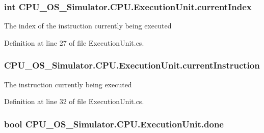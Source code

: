 \subsubsection[{current\+Index}]{\setlength{\rightskip}{0pt plus 5cm}int C\+P\+U\+\_\+\+O\+S\+\_\+\+Simulator.\+C\+P\+U.\+Execution\+Unit.\+current\+Index\hspace{0.3cm}{\ttfamily [private]}}\label{class_c_p_u___o_s___simulator_1_1_c_p_u_1_1_execution_unit_af6807cb5343acc2c40a08166c748f1f0}


The index of the instruction currently being executed 



Definition at line 27 of file Execution\+Unit.\+cs.

\hypertarget{class_c_p_u___o_s___simulator_1_1_c_p_u_1_1_execution_unit_a12fc8d1fd19eab177941b9f98675eb7f}{}
\subsubsection[{current\+Instruction}]{ C\+P\+U\+\_\+\+O\+S\+\_\+\+Simulator.\+C\+P\+U.\+Execution\+Unit.\+current\+Instruction\hspace{0.3cm}{\ttfamily [private]}}\label{class_c_p_u___o_s___simulator_1_1_c_p_u_1_1_execution_unit_a12fc8d1fd19eab177941b9f98675eb7f}


The instruction currently being executed 



Definition at line 32 of file Execution\+Unit.\+cs.

\hypertarget{class_c_p_u___o_s___simulator_1_1_c_p_u_1_1_execution_unit_aa62cb66691fd4d782a4fa5c70843da6e}{}
\subsubsection[{done}]{\setlength{\rightskip}{0pt plus 5cm}bool C\+P\+U\+\_\+\+O\+S\+\_\+\+Simulator.\+C\+P\+U.\+Execution\+Unit.\+done\hspace{0.3cm}{\ttfamily [private]}}\label{class_c_p_u___o_s___simulator_1_1_c_p_u_1_1_execution_unit_aa62cb66691fd4d782a4fa5c70843da6e}


